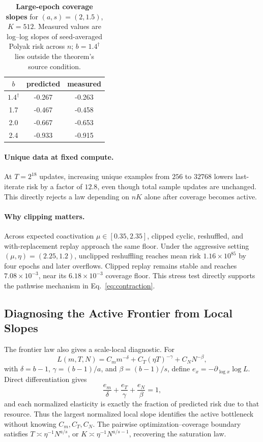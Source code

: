 \documentclass[letterpaper]{article}
\begin{document}
\begin{table}[t]
\centering
\caption{\textbf{Large-epoch coverage slopes} for $(a,s)=(2,1.5)$, $K=512$.
Measured values are log--log slopes of seed-averaged Polyak risk across $n$;
$b=1.4^\dagger$ lies outside the theorem's source condition.}
\label{tab:source}
\begin{tabular}{ccc}
\toprule
$b$ & predicted & measured \\
\midrule
$1.4^\dagger$ & -0.267 & -0.263 \\
1.7 & -0.467 & -0.458 \\
2.0 & -0.667 & -0.653 \\
2.4 & -0.933 & -0.915 \\
\bottomrule
\end{tabular}
\end{table}

\paragraph{Unique data at fixed compute.}
At $T=2^{18}$ updates, increasing unique examples from $256$ to $32768$ lowers
last-iterate risk by a factor of $12.8$, even though total sample updates are
unchanged. This directly rejects a law depending on $nK$ alone after coverage
becomes active.

\paragraph{Why clipping matters.}
Across expected coactivation $\mu\in[0.35,2.35]$, clipped cyclic, reshuffled,
and with-replacement replay approach the same floor. Under the aggressive
setting $(\mu,\eta)=(2.25,1.2)$, unclipped reshuffling reaches mean risk
$1.16\times10^{85}$ by four epochs and later overflows. Clipped replay remains
stable and reaches $7.08\times10^{-3}$, near its
$6.18\times10^{-3}$ coverage floor. This stress test directly supports the
pathwise mechanism in Eq.~\eqref{eq:contraction}.


\subsection{Diagnosing the Active Frontier from Local Slopes}

The frontier law also gives a scale-local diagnostic.  For
\begin{equation}
L(m,T,N)=C_m m^{-\delta}+C_T(\eta T)^{-\gamma}+C_NN^{-\beta},
\label{eq:elasticity-proxy}
\end{equation}
with $\delta=b-1$, $\gamma=(b-1)/a$, and $\beta=(b-1)/s$, define
$e_x=-\partial_{\log x}\log L$.  Direct differentiation gives
\begin{equation}
\frac{e_m}{\delta}+\frac{e_T}{\gamma}+\frac{e_N}{\beta}=1,
\label{eq:elasticity-simplex}
\end{equation}
and each normalized elasticity is exactly the fraction of predicted risk due
to that resource.  Thus the largest normalized local slope identifies the
active bottleneck without knowing $C_m,C_T,C_N$.  The pairwise
optimization--coverage boundary satisfies $T\asymp\eta^{-1}N^{a/s}$, or
$K\asymp\eta^{-1}N^{a/s-1}$, recovering the saturation law.
\end{document}
